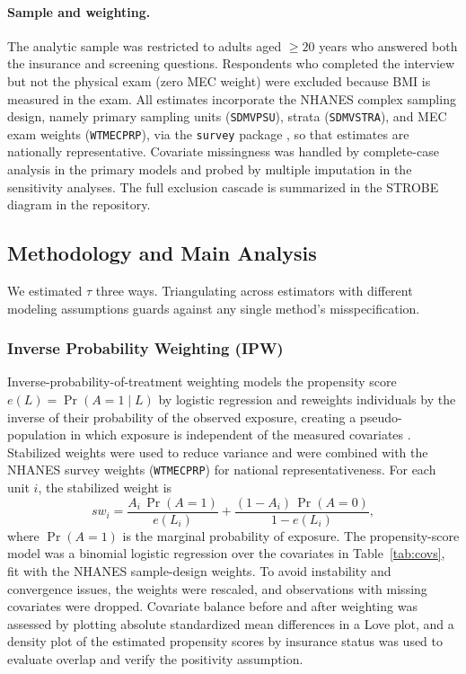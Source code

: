 \documentclass[12pt]{article}
\begin{document}
\paragraph{Sample and weighting.} The analytic sample was restricted to adults
aged $\geq 20$ years who answered both the insurance and screening questions.
Respondents who completed the interview but not the physical exam (zero MEC
weight) were excluded because BMI is measured in the exam. All estimates
incorporate the NHANES complex sampling design, namely primary sampling units
(\texttt{SDMVPSU}), strata (\texttt{SDMVSTRA}), and MEC exam weights
(\texttt{WTMECPRP}), via the \texttt{survey} package \cite{lumley2004}, so that
estimates are nationally representative. Covariate missingness was handled by
complete-case analysis in the primary models and probed by multiple imputation
in the sensitivity analyses. The full exclusion cascade is summarized in the
STROBE diagram in the repository.

\subsection{Methodology and Main Analysis} \label{subsec:meth_analysis}

We estimated $\tau$ three ways. Triangulating across estimators with different
modeling assumptions guards against any single method's misspecification.

\subsubsection{Inverse Probability Weighting (IPW)}

Inverse-probability-of-treatment weighting models the propensity score
$e(L) = \Pr(A = 1 \mid L)$ by logistic regression and reweights individuals by
the inverse of their probability of the observed exposure, creating a
pseudo-population in which exposure is independent of the measured covariates
\cite{robins2000}. Stabilized weights were used to reduce variance and were
combined with the NHANES survey weights (\texttt{WTMECPRP}) for national
representativeness. For each unit $i$, the stabilized weight is
\begin{equation}
sw_i = \frac{A_i\,\Pr(A = 1)}{e(L_i)} + \frac{(1 - A_i)\,\Pr(A = 0)}{1 - e(L_i)},
\end{equation}
where $\Pr(A = 1)$ is the marginal probability of exposure. The propensity-score
model was a binomial logistic regression over the covariates in
Table~\ref{tab:covs}, fit with the NHANES sample-design weights. To avoid
instability and convergence issues, the weights were rescaled, and observations
with missing covariates were dropped. Covariate balance before and after
weighting was assessed by plotting absolute standardized mean differences in a
Love plot, and a density plot of the estimated propensity scores by insurance
status was used to evaluate overlap and verify the positivity assumption.
\end{document}
